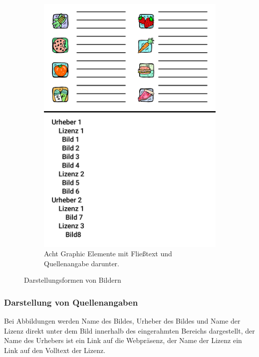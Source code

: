 \begin{figure}[ht]
\begin{subfigure}[b]{\columnwidth/2}
    \includegraphics[width=\columnwidth]{images/icon-example.pdf}
    \caption{Acht Graphic Elemente mit Fließtext und Quellenangabe darunter.}
    \label{fig:image-rendering-icon}
  \end{subfigure}
  \caption{Darstellungsformen von Bildern}
  \label{fig:image-rendering}
\end{figure}

\subsubsection{Darstellung von Quellenangaben}

Bei Abbildungen werden Name des Bildes, Urheber des Bildes und Name der Lizenz
direkt unter dem Bild innerhalb des eingerahmten Bereichs dargestellt, der Name
des Urhebers ist ein Link auf die Webpräsenz, der Name der Lizenz ein Link
auf den Volltext der Lizenz.

